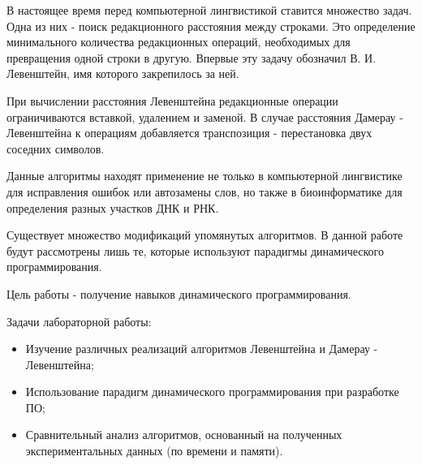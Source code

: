 \setcounter{page}{4}

В настоящее время перед компьютерной лингвистикой ставится множество задач. Одна из них - поиск редакционного расстояния между строками. Это определение минимального количества редакционных операций, необходимых для превращения одной строки в другую. Впервые эту задачу обозначил В. И. Левенштейн, имя которого закрепилось за ней.

При вычислении расстояния Левенштейна редакционные операции ограничиваются вставкой, удалением и заменой. В случае расстояния Дамерау - Левенштейна к операциям добавляется транспозиция - перестановка двух соседних символов.

Данные алгоритмы находят применение не только в компьютерной лингвистике для исправления ошибок или автозамены слов, но также в биоинформатике для определения разных участков ДНК и РНК.

Существует множество модификаций упомянутых алгоритмов. В данной работе будут рассмотрены лишь те, которые используют парадигмы динамического программирования.

Цель работы - получение навыков динамического программирования.

Задачи лабораторной работы:
\begin{itemize}
	\item Изучение различных реализаций алгоритмов Левенштейна и Дамерау - Левенштейна;
	\item Использование парадигм динамического программирования при разработке ПО;
	\item Сравнительный анализ алгоритмов, основанный на полученных экспериментальных данных (по времени и памяти).
\end{itemize}